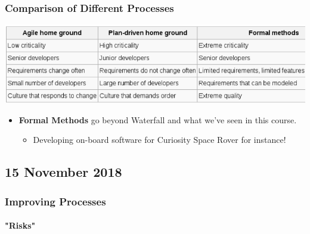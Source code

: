 \documentclass[a4paper]{article}
\providecommand{\tightlist}{%
  \setlength{\itemsep}{0pt}\setlength{\parskip}{0pt}}
\let\oldparagraph\paragraph
\renewcommand{\paragraph}[1]{\oldparagraph{#1}\mbox{}}
\begin{document}
\hypertarget{comparison-of-different-processes}{%
\subsubsection{Comparison of Different
Processes}\label{comparison-of-different-processes}}

\includegraphics{2C-SE.assets/1543148442267.png}

\begin{itemize}
\tightlist
\item
  \textbf{Formal Methods} go beyond Waterfall and what we've seen in
  this course.

  \begin{itemize}
  \tightlist
  \item
    Developing on-board software for Curiosity Space Rover for instance!
  \end{itemize}
\end{itemize}

\hypertarget{15-november-2018}{%
\subsection{15 November 2018}\label{15-november-2018}}

\hypertarget{improving-processes}{%
\subsubsection{Improving Processes}\label{improving-processes}}

\hypertarget{risks}{%
\paragraph{"Risks"}\label{risks}}
\end{document}
